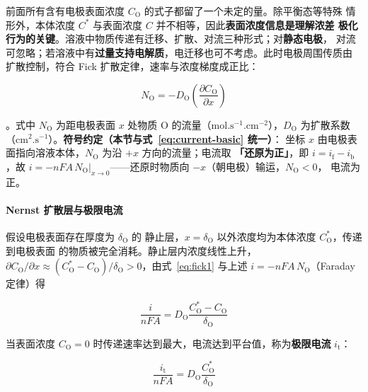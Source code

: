 前面所有含有电极表面浓度 $C_{\mathrm{O}}$ 的式子都留了一个未定的量。除平衡态等特殊
情形外，本体浓度 $C^*$ 与表面浓度 $C$ 并不相等，因此\textbf{表面浓度信息是理解浓差
极化行为的关键}。溶液中物质传递有迁移、扩散、对流三种形式；对\textbf{静态电极}，
对流可忽略；若溶液中有\textbf{过量支持电解质}，电迁移也可不考虑。此时电极周围传质由
扩散控制，符合 Fick 扩散定律，速率与浓度梯度成正比：

\begin{equation}
N_{\mathrm{O}}=-D_{\mathrm{O}}\left(\frac{\partial C_{\mathrm{O}}}{\partial x}\right)
\label{eq:fick1}
\end{equation}

。式中 $N_{\mathrm{O}}$ 为距电极表面 $x$ 处物质
$\mathrm{O}$ 的流量（$\mathrm{mol.s^{-1}.cm^{-2}}$），$D_{\mathrm{O}}$ 为扩散系数
（$\mathrm{cm^2.s^{-1}}$）。\textbf{符号约定（本节与式~\eqref{eq:current-basic} 统一）}：
坐标 $x$ 由电极表面指向溶液本体，$N_{\mathrm{O}}$ 为沿 $+x$ 方向的流量；电流取
\textbf{「还原为正」}，即 $i=i_{\mathrm{f}}-i_{\mathrm{b}}$，故
$i=-nFA\,N_{\mathrm{O}}|_{x\to0}$——还原时物质向 $-x$（朝电极）输运，$N_{\mathrm{O}}<0$，
电流为正。

\paragraph{Nernst 扩散层与极限电流} 假设电极表面存在厚度为 $\delta_{\mathrm{O}}$ 的
静止层，$x=\delta_{\mathrm{O}}$ 以外浓度均为本体浓度 $C_{\mathrm{O}}^*$，传递到电极表面
的物质被完全消耗。静止层内浓度线性上升，
$\partial C_{\mathrm{O}}/\partial x\approx
(C_{\mathrm{O}}^*-C_{\mathrm{O}})/\delta_{\mathrm{O}}>0$，由式~\eqref{eq:fick1} 与上述
$i=-nFA\,N_{\mathrm{O}}$（Faraday 定律）得

\begin{equation}
\frac{i}{nFA}=D_{\mathrm{O}}
\frac{C_{\mathrm{O}}^*-C_{\mathrm{O}}}{\delta_{\mathrm{O}}}
\label{eq:diff-layer}
\end{equation}

当表面浓度 $C_{\mathrm{O}}=0$ 时传递速率达到最大，电流达到平台值，称为\textbf{极限电流}
$i_{\mathrm{t}}$：

\begin{equation}
\frac{i_{\mathrm{t}}}{nFA}=D_{\mathrm{O}}
\frac{C_{\mathrm{O}}^*}{\delta_{\mathrm{O}}}
\label{eq:il}
\end{equation}

